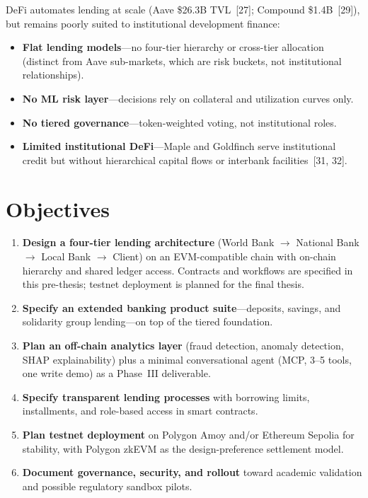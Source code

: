 \documentclass[12pt,a4paper]{report}
\begin{document}
DeFi automates lending at scale (Aave \$26.3B TVL~[27]; Compound \$1.4B~[29]), but remains poorly suited to institutional development finance:
\begin{itemize}[noitemsep]
\item \textbf{Flat lending models}---no four-tier hierarchy or cross-tier allocation (distinct from Aave sub-markets, which are risk buckets, not institutional relationships).
\item \textbf{No ML risk layer}---decisions rely on collateral and utilization curves only.
\item \textbf{No tiered governance}---token-weighted voting, not institutional roles.
\item \textbf{Limited institutional DeFi}---Maple and Goldfinch serve institutional credit but without hierarchical capital flows or interbank facilities~[31, 32].
\end{itemize}

\section{Objectives}

\begin{enumerate}[noitemsep]
\item \textbf{Design a four-tier lending architecture} (World Bank $\to$ National Bank $\to$ Local Bank $\to$ Client) on an EVM-compatible chain with on-chain hierarchy and shared ledger access. Contracts and workflows are specified in this pre-thesis; testnet deployment is planned for the final thesis.
\item \textbf{Specify an extended banking product suite}---deposits, savings, and solidarity group lending---on top of the tiered foundation.
\item \textbf{Plan an off-chain analytics layer} (fraud detection, anomaly detection, SHAP explainability) plus a minimal conversational agent (MCP, 3--5 tools, one write demo) as a Phase~III deliverable.
\item \textbf{Specify transparent lending processes} with borrowing limits, installments, and role-based access in smart contracts.
\item \textbf{Plan testnet deployment} on Polygon Amoy and/or Ethereum Sepolia for stability, with Polygon zkEVM as the design-preference settlement model.
\item \textbf{Document governance, security, and rollout} toward academic validation and possible regulatory sandbox pilots.
\end{enumerate}
\end{document}
